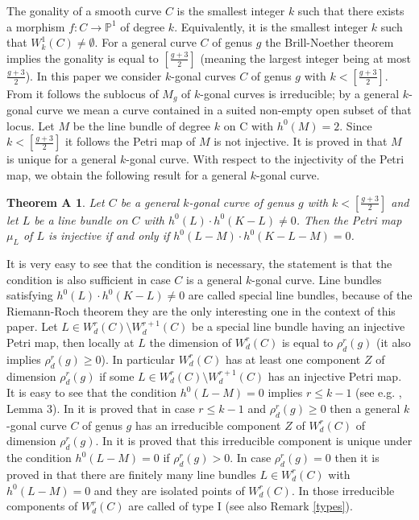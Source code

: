 \documentclass{article}
\newtheorem*{theoremA}{Theorem A}
\theoremstyle{definition}
\theoremstyle{remark}
\begin{document}
The gonality of a smooth curve $C$ is the smallest integer $k$ such that there exists a morphism $f:C \rightarrow \mathbb{P}^1$ of degree $k$.
Equivalently, it is the smallest integer $k$ such that $W^1_k(C) \neq \emptyset$.
For a general curve $C$ of genus $g$ the Brill-Noether theorem implies the gonality is equal to $[\frac{g+3}{2}]$ (meaning the largest integer being at most $\frac{g+3}{2}$).
In this paper we consider $k$-gonal curves $C$ of genus $g$ with $k<[\frac{g+3}{2}]$.
From \cite{ref15} it follows the sublocus of $M_g$ of $k$-gonal curves is irreducible; by a general $k$-gonal curve we mean a curve contained in a suited non-empty open subset of that locus.
Let $M$ be the line bundle of degree $k$ on C with $h^0(M)=2$.
Since $k<[\frac{g+3}{2}]$ it follows the Petri map of $M$ is not injective.
It is proved in \cite{AC} that $M$ is unique for a general $k$-gonal curve.
With respect to the injectivity of the Petri map, we obtain the following result for a general $k$-gonal curve.
\begin{theoremA}
Let $C$ be a general $k$-gonal curve of genus $g$ with $k<[\frac{g+3}{2}]$ and let $L$ be a line bundle on $C$ with $h^0(L)\cdot h^0(K-L) \neq 0$.
Then the Petri map $\mu_L$ of $L$ is injective if and only if $h^0(L-M)\cdot h^0(K-L-M)=0$.
\end{theoremA}
It is very easy to see that the condition is necessary, the statement is that the condition is also sufficient in case $C$ is a general $k$-gonal curve.
Line bundles satisfying $h^0(L)\cdot h^0(K-L) \neq 0$ are called special line bundles, because of the Riemann-Roch theorem they are the only interesting one in the context of this paper.
Let $L \in W^r_d(C) \setminus W^{r+1}_d(C)$ be a special line bundle having an injective Petri map, then locally at $L$ the dimension of $W^r_d(C)$ is equal to $\rho ^r_d(g)$ (it also implies $\rho ^r_d(g) \geq 0$).
In particular $W^r_d(C)$ has at least one component $Z$ of dimension $\rho^r_d(g)$ if some $L\in W^r_d(C) \setminus W^{r+1}_d(C)$ has an injective Petri map.
It is easy to see that the condition $h^0(L-M)=0$ implies $r \leq k-1$ (see e.g. \cite{ref2}, Lemma 3).
In \cite{CM} it is proved that in case $r\leq k-1$ and $\rho ^r_d(g) \geq 0$ then a general $k$-gonal curve $C$ of genus $g$ has an irreducible component $Z$ of $W^r_d(C)$ of dimension $\rho^r_d(g)$.
In \cite{ref6} it is proved that this irreducible component is unique under the condition $h^0(L-M)=0$ if $\rho ^r_d(g)>0$.
In case $\rho^r_d(g)=0$ then it is proved in \cite {ref7} that there are finitely many line bundles $L \in W^r_d(C)$ with $h^0(L-M)=0$ and they are isolated points of $W^r_d(C)$.
In \cite {ref7} those irreducible components of $W^r_d(C)$ are called of type I (see also Remark \ref{types}).
\end{document}
